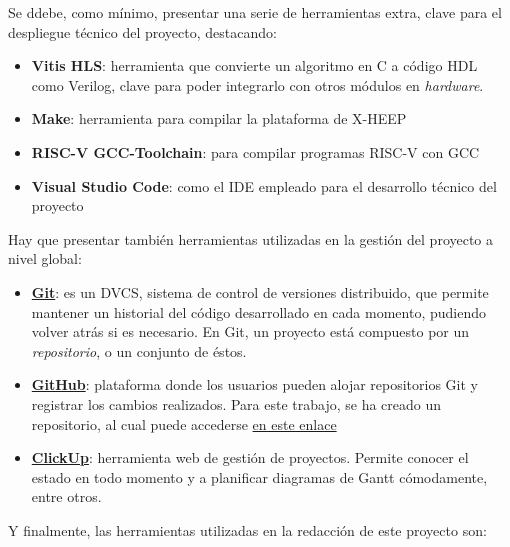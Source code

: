 Se ddebe, como mínimo, presentar una serie de herramientas extra, clave para el despliegue técnico del proyecto, destacando:

\begin{itemize}
    \item \textbf{Vitis HLS}: \cite{vitisHLSInfo} herramienta que convierte un algoritmo en C a código HDL como Verilog, clave para poder integrarlo con otros módulos en \textit{hardware}. 
    \item \textbf{Make}\cite{makeInfo}: herramienta para compilar la plataforma de X-HEEP
    \item \textbf{RISC-V GCC-Toolchain}\cite{gccRISCVInfo}: para compilar programas RISC-V con \ac{GCC}
    \item \textbf{Visual Studio Code}\cite{vscodeInfo}: como el \ac{IDE} empleado para el desarrollo técnico del proyecto
\end{itemize}

Hay que presentar también herramientas utilizadas en la gestión del proyecto a nivel global:

\begin{itemize}
    \item \textbf{\href{https://git-scm.com/downloads}{Git}}: es un \ac{DVCS}, sistema de control de versiones distribuido, que permite mantener un historial del código desarrollado en cada momento, pudiendo volver atrás si es necesario. En Git, un proyecto está compuesto por un \emph{repositorio}, o un conjunto de éstos.
    \item \textbf{\href{https://github.com/}{GitHub}}: plataforma donde los usuarios pueden alojar repositorios Git y registrar los cambios realizados. Para este trabajo, se ha creado un repositorio, al cual puede accederse \href{https://github.com/fluctlights/perte_tfm} {en este enlace}
    \item \textbf{\href{https://clickup.com/}{ClickUp}}: herramienta web de gestión de proyectos. Permite conocer el estado en todo momento y a planificar diagramas de Gantt cómodamente, entre otros.
\end{itemize}

Y finalmente, las herramientas utilizadas en la redacción de este proyecto son:


